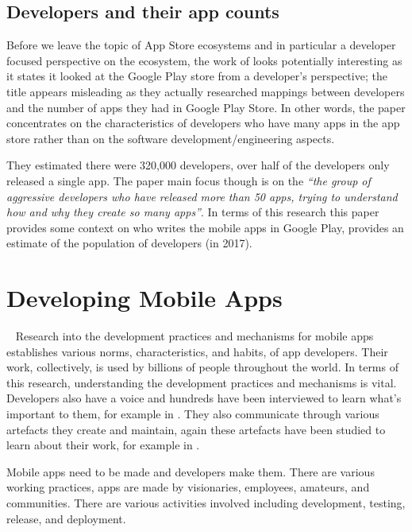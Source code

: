 \subsection{Developers and their app counts}
Before we leave the topic of App Store ecosystems and in particular a developer focused perspective on the ecosystem, the work of \textcite{wang2017_exploratory_study_of_the_mobile_app_ecosystem} looks potentially interesting as it states it looked at the Google Play store from a developer's perspective; the title appears misleading as they actually researched mappings between developers and the number of apps they had in Google Play Store. In other words, the paper concentrates on the characteristics of developers who have many apps in the app store rather than on the software development/engineering aspects.

They estimated there were 320,000 developers, over half of the developers only released a single app. The paper main focus though is on the \emph{``the group of aggressive developers who have released more than 50 apps, trying to understand how and why they create so many apps''}. In terms of this research this paper provides some context on who writes the mobile apps in Google Play, provides an estimate of the population of developers (in 2017).


\section{Developing Mobile Apps}~\label{rw-developing-mobile-apps-section}
Research into the development practices and mechanisms for mobile apps establishes various norms, characteristics, and habits, of app developers. Their work, collectively, is used by billions of people throughout the world. In terms of this research, understanding the development practices and mechanisms is vital. Developers also have a voice and hundreds have been interviewed to learn what's important to them, for example in . They also communicate through various artefacts they create and maintain, again these artefacts have been studied to learn about their work, for example in .


Mobile apps need to be made and developers make them. There are various working practices, apps are made by visionaries, employees, amateurs, and communities. There are various activities involved including development, testing, release, and deployment. %

